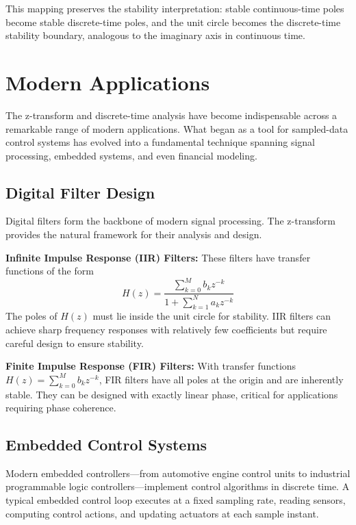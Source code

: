 This mapping preserves the stability interpretation: stable continuous-time poles become stable discrete-time poles, and the unit circle becomes the discrete-time stability boundary, analogous to the imaginary axis in continuous time.

\section{Modern Applications}

The z-transform and discrete-time analysis have become indispensable across a remarkable range of modern applications. What began as a tool for sampled-data control systems has evolved into a fundamental technique spanning signal processing, embedded systems, and even financial modeling.

\subsection{Digital Filter Design}

Digital filters form the backbone of modern signal processing. The z-transform provides the natural framework for their analysis and design.

\textbf{Infinite Impulse Response (IIR) Filters:} These filters have transfer functions of the form
\begin{equation}
H(z) = \frac{\sum_{k=0}^{M} b_k z^{-k}}{1 + \sum_{k=1}^{N} a_k z^{-k}}
\end{equation}
The poles of $H(z)$ must lie inside the unit circle for stability. IIR filters can achieve sharp frequency responses with relatively few coefficients but require careful design to ensure stability.

\textbf{Finite Impulse Response (FIR) Filters:} With transfer functions $H(z) = \sum_{k=0}^{M} b_k z^{-k}$, FIR filters have all poles at the origin and are inherently stable. They can be designed with exactly linear phase, critical for applications requiring phase coherence.

\subsection{Embedded Control Systems}

Modern embedded controllers---from automotive engine control units to industrial programmable logic controllers---implement control algorithms in discrete time. A typical embedded control loop executes at a fixed sampling rate, reading sensors, computing control actions, and updating actuators at each sample instant.

